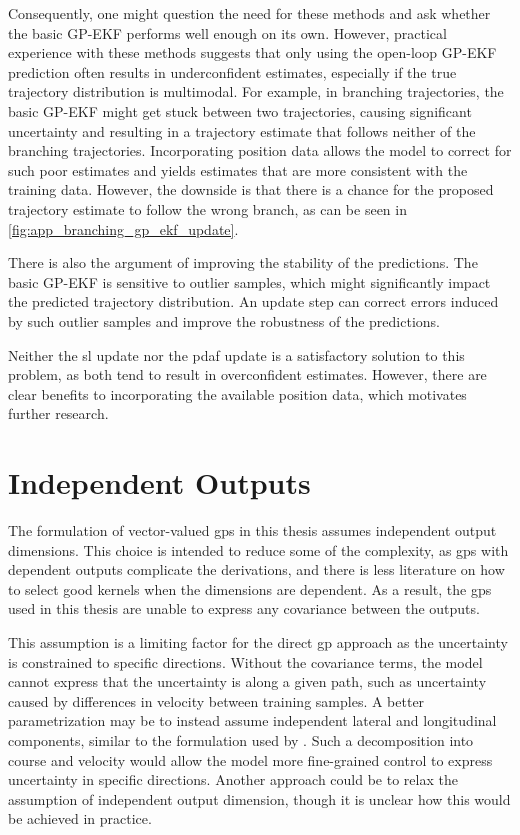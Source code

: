 Consequently, one might question the need for these methods and ask whether the basic GP-EKF performs well enough on its own. However, practical experience with these methods suggests that only using the open-loop GP-EKF prediction often results in underconfident estimates, especially if the true trajectory distribution is multimodal. For example, in branching trajectories, the basic GP-EKF might get stuck between two trajectories, causing significant uncertainty and resulting in a trajectory estimate that follows neither of the branching trajectories. Incorporating position data allows the model to correct for such poor estimates and yields estimates that are more consistent with the training data. However, the downside is that there is a chance for the proposed trajectory estimate to follow the wrong branch, as can be seen in \cref{fig:app_branching_gp_ekf_update}.

There is also the argument of improving the stability of the predictions. The basic GP-EKF is sensitive to outlier samples, which might significantly impact the predicted trajectory distribution. An update step can correct errors induced by such outlier samples and improve the robustness of the predictions. 

Neither the \acrshort{sl} update nor the \acrshort{pdaf} update is a satisfactory solution to this problem, as both tend to result in overconfident estimates. However, there are clear benefits to incorporating the available position data, which motivates further research.    



\section{Independent Outputs}
The formulation of vector-valued \acrshort{gp}s in this thesis assumes independent output dimensions. This choice is intended to reduce some of the complexity, as \acrshort{gp}s with dependent outputs complicate the derivations, and there is less literature on how to select good kernels when the dimensions are dependent. As a result, the \acrshort{gp}s used in this thesis are unable to express any covariance between the outputs. 

This assumption is a limiting factor for the direct \acrshort{gp} approach as the uncertainty is constrained to specific directions. Without the covariance terms, the model cannot express that the uncertainty is along a given path, such as uncertainty caused by differences in velocity between training samples. A better parametrization may be to instead assume independent lateral and longitudinal components, similar to the formulation used by \cite{gp_ais_trajectory}. Such a decomposition into course and velocity would allow the model more fine-grained control to express uncertainty in specific directions. Another approach could be to relax the assumption of independent output dimension, though it is unclear how this would be achieved in practice. 

